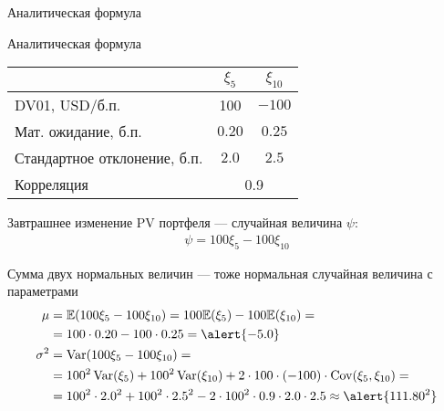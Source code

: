 \documentclass{beamer}
\begin{document}
\begin{frame}{Аналитическая формула}
\centering
{}
\end{frame}



\begin{frame}{Аналитическая формула}
\centering
\begin{tabular}{l|c|c}
 & $\xi_5$ & $\xi_{10}$ \\ \hline
DV01, USD/б.п. & 100 & $-100$ \\
Мат. ожидание, б.п. & $0.20$ & $0.25$ \\
Стандартное отклонение, б.п. & $2.0$ & $2.5$ \\ \hline
Корреляция & \multicolumn{2}{c}{0.9}
\end{tabular}

\justify
Завтрашнее изменение PV портфеля --- случайная величина $\psi$:
\begin{align*}
\psi = 100\xi_5 - 100\xi_{10}
\end{align*}

\justify
Сумма двух нормальных величин --- тоже нормальная случайная величина с параметрами
\begin{align*}
\mu &= \mathbb{E}(100\xi_5 - 100\xi_{10}) = 100\mathbb{E}(\xi_5) - 100\mathbb{E}(\xi_{10}) = \\
&= 100 \cdot 0.20 - 100 \cdot 0.25 = \alert{-5.0} \\
\sigma^2 &= \operatorname{Var}(100\xi_5 - 100\xi_{10}) = \\
&= 100^2\operatorname{Var}(\xi_5) + 100^2\operatorname{Var}(\xi_{10}) + 2 \cdot 100 \cdot(-100) \cdot \operatorname{Cov}(\xi_5, \xi_{10}) = \\
&= 100^2 \cdot 2.0^2 + 100^2\cdot 2.5^2 - 2 \cdot 100^2 \cdot 0.9 \cdot 2.0 \cdot 2.5
\approx \alert{111.80^2}
\end{align*}
\end{frame}
\end{document}
